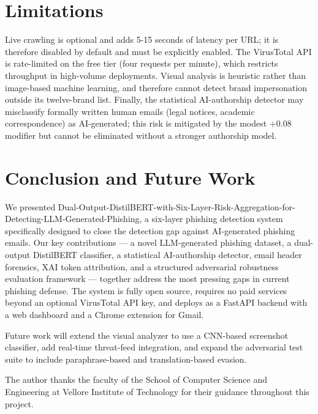 \documentclass[pdflatex,sn-mathphys-num]{sn-jnl}
\begin{document}
\section{Limitations}\label{sec:limitations}

Live crawling is optional and adds 5-15 seconds of latency per URL; it is therefore disabled by default and must be explicitly enabled. The VirusTotal API is rate-limited on the free tier (four requests per minute), which restricts throughput in high-volume deployments. Visual analysis is heuristic rather than image-based machine learning, and therefore cannot detect brand impersonation outside its twelve-brand list. Finally, the statistical AI-authorship detector may misclassify formally written human emails (legal notices, academic correspondence) as AI-generated; this risk is mitigated by the modest +0.08 modifier but cannot be eliminated without a stronger authorship model.

\section{Conclusion and Future Work}\label{sec:conclusion}

We presented Dual-Output-DistilBERT-with-Six-Layer-Risk-Aggregation-for-Detecting-LLM-Generated-Phishing, a six-layer phishing detection system specifically designed to close the detection gap against AI-generated phishing emails. Our key contributions --- a novel LLM-generated phishing dataset, a dual-output DistilBERT classifier, a statistical AI-authorship detector, email header forensics, XAI token attribution, and a structured adversarial robustness evaluation framework --- together address the most pressing gaps in current phishing defense. The system is fully open source, requires no paid services beyond an optional VirusTotal API key, and deploys as a FastAPI backend with a web dashboard and a Chrome extension for Gmail.

Future work will extend the visual analyzer to use a CNN-based screenshot classifier, add real-time threat-feed integration, and expand the adversarial test suite to include paraphrase-based and translation-based evasion.

\backmatter


The author thanks the faculty of the School of Computer Science and Engineering at Vellore Institute of Technology for their guidance throughout this project.
\end{document}

